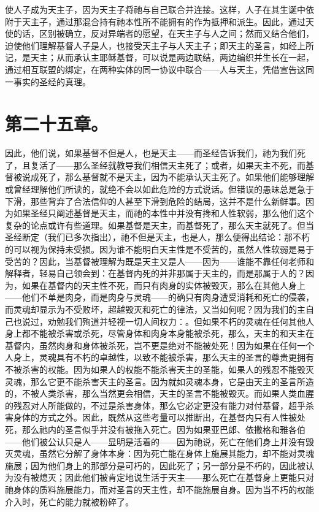 使人子成为天主子，因为天主子将祂与自己联合并连接。这样，人子在其生诞中依附于天主子，通过那混合持有祂本性所不能拥有的作为抵押和派生。因此，通过天使的话，区别被确立，反对异端者的愿望，在天主子与人之间；然而又结合他们，迫使他们理解基督人子是人，也接受天主子与人天主子；即天主的圣言，如经上所记，是天主；从而承认主耶稣基督，可以说是两边联结，两边编织并生长在一起，通过相互联盟的绑定，在两种实体的同一协议中联合——人与天主，凭借宣告这同一事实的圣经的真理。\par


\section{第二十五章。}

\par

因此，他们说，如果基督不但是人，也是天主——而圣经告诉我们，祂为我们死了，且复活了——那么圣经就教导我们相信天主死了；或者，如果天主不死，而基督被说成死了，那么基督就不是天主，因为不能承认天主死了。如果他们能够理解或曾经理解他们所读的，就绝不会以如此危险的方式说话。但错误的愚昧总是急于下滑，那些背弃了合法信仰的人甚至下滑到危险的结局，这并不是什么新鲜事。因为如果圣经只阐述基督是天主，而祂的本性中并没有搀和人性软弱，那么他们这个复杂的论点或许有些道理。如果基督是天主，而基督死了，那么天主就死了。但当圣经断定（我们已多次指出），祂不但是天主，也是人，那么便得出结论：那不朽的可以视为保持未受损。因为谁不能明白天主性是不受苦的，虽然人性软弱是易于受苦的？因此，当基督被理解为既是天主又是人——因为——谁能不靠任何老师和解释者，轻易自己领会到：在基督内死的并非那属于天主的，而是那属于人的？因为，如果在基督内的天主性不死，而只有肉身的实体被毁灭，那么在其他人身上——他们不单是肉身，而是肉身与灵魂——的确只有肉身遭受消耗和死亡的侵袭，而灵魂却显示为不受败坏，超越毁灭和死亡的律法，又当如何呢？因为我们的主自己也说过，劝勉我们殉道并轻视一切人间权力：。但如果不朽的灵魂在任何其他人身上都不能被杀害或杀死，尽管身体和肉身本身能被杀死，那么，天主的和天主在基督内，虽然肉身和身体被杀死，岂不更是绝对不能被处死！因为如果在任何一个人身上，灵魂具有不朽的卓越性，以致不能被杀害，那么天主的圣言的尊贵更拥有不被杀害的权能。因为如果人的权能不能杀害天主的圣能，如果人的残忍不能毁灭灵魂，那么它更不能杀害天主的圣言。因为就如灵魂本身，它是由天主的圣言所造的，不被人类杀害，那么当然更会相信，天主的圣言不能被毁灭。而如果人类血腥的残忍对人所能做的，不过是杀害身体，那么它必定更没有能力对付基督，超乎杀害身体的方式之外。因此，既然从这些考量可以推断出，在基督内只有人性被处死，那么祂内的圣言似乎并没有被拖入死亡。因为如果亚巴郎、依撒格和雅各伯——他们被公认只是人——显明是活着的——因为祂说，死亡在他们身上并没有毁灭灵魂，虽然它分解了身体本身：因为死亡能在身体上施展其能力，却不能对灵魂施展；因为他们身上的那部分是可朽的，因此死了；另一部分是不朽的，因此被认为没有被熄灭；因此他们被肯定地说生活于天主——那么死亡在基督身上更能只对祂身体的质料施展能力，而对圣言的天主性，却不能施展自身。因为当不朽的权能介入时，死亡的能力就被粉碎了。\par

